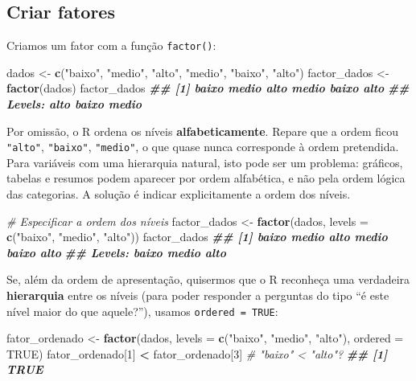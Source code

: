 \documentclass[
  portuguese,
  11pt,
  openany]{book}
\newenvironment{Shaded}{\begin{snugshade}}{\end{snugshade}}
\newcommand{\AttributeTok}[1]{\textcolor[rgb]{0.13,0.29,0.53}{#1}}
\newcommand{\CommentTok}[1]{\textcolor[rgb]{0.56,0.35,0.01}{\textit{#1}}}
\newcommand{\ConstantTok}[1]{\textcolor[rgb]{0.56,0.35,0.01}{#1}}
\newcommand{\DecValTok}[1]{\textcolor[rgb]{0.00,0.00,0.81}{#1}}
\newcommand{\DocumentationTok}[1]{\textcolor[rgb]{0.56,0.35,0.01}{\textbf{\textit{#1}}}}
\newcommand{\FunctionTok}[1]{\textcolor[rgb]{0.13,0.29,0.53}{\textbf{#1}}}
\newcommand{\NormalTok}[1]{#1}
\newcommand{\OtherTok}[1]{\textcolor[rgb]{0.56,0.35,0.01}{#1}}
\newcommand{\SpecialCharTok}[1]{\textcolor[rgb]{0.81,0.36,0.00}{\textbf{#1}}}
\newcommand{\StringTok}[1]{\textcolor[rgb]{0.31,0.60,0.02}{#1}}
\begin{document}
\subsection{Criar fatores}\label{criar-fatores}

Criamos um fator com a função \texttt{factor()}:

\begin{Shaded}
\begin{Highlighting}[]
\NormalTok{dados }\OtherTok{\textless{}{-}} \FunctionTok{c}\NormalTok{(}\StringTok{"baixo"}\NormalTok{, }\StringTok{"medio"}\NormalTok{, }\StringTok{"alto"}\NormalTok{, }\StringTok{"medio"}\NormalTok{, }\StringTok{"baixo"}\NormalTok{, }\StringTok{"alto"}\NormalTok{)}
\NormalTok{factor\_dados }\OtherTok{\textless{}{-}} \FunctionTok{factor}\NormalTok{(dados)}
\NormalTok{factor\_dados}
\DocumentationTok{\#\# [1] baixo medio alto  medio baixo alto }
\DocumentationTok{\#\# Levels: alto baixo medio}
\end{Highlighting}
\end{Shaded}

Por omissão, o R ordena os níveis \textbf{alfabeticamente}. Repare que a ordem ficou \texttt{"alto"}, \texttt{"baixo"}, \texttt{"medio"}, o que quase nunca corresponde à ordem pretendida. Para variáveis com uma hierarquia natural, isto pode ser um problema: gráficos, tabelas e resumos podem aparecer por ordem alfabética, e não pela ordem lógica das categorias. A solução é indicar explicitamente a ordem dos níveis.

\begin{Shaded}
\begin{Highlighting}[]
\CommentTok{\# Especificar a ordem dos níveis}
\NormalTok{factor\_dados }\OtherTok{\textless{}{-}} \FunctionTok{factor}\NormalTok{(dados, }\AttributeTok{levels =} \FunctionTok{c}\NormalTok{(}\StringTok{"baixo"}\NormalTok{, }\StringTok{"medio"}\NormalTok{, }\StringTok{"alto"}\NormalTok{))}
\NormalTok{factor\_dados}
\DocumentationTok{\#\# [1] baixo medio alto  medio baixo alto }
\DocumentationTok{\#\# Levels: baixo medio alto}
\end{Highlighting}
\end{Shaded}

Se, além da ordem de apresentação, quisermos que o R reconheça uma verdadeira
\textbf{hierarquia} entre os níveis (para poder responder a perguntas do tipo ``é este
nível maior do que aquele?''), usamos \texttt{ordered\ =\ TRUE}:

\begin{Shaded}
\begin{Highlighting}[]
\NormalTok{fator\_ordenado }\OtherTok{\textless{}{-}} \FunctionTok{factor}\NormalTok{(dados,}
                         \AttributeTok{levels =} \FunctionTok{c}\NormalTok{(}\StringTok{"baixo"}\NormalTok{, }\StringTok{"medio"}\NormalTok{, }\StringTok{"alto"}\NormalTok{),}
                         \AttributeTok{ordered =} \ConstantTok{TRUE}\NormalTok{)}
\NormalTok{fator\_ordenado[}\DecValTok{1}\NormalTok{] }\SpecialCharTok{\textless{}}\NormalTok{ fator\_ordenado[}\DecValTok{3}\NormalTok{]   }\CommentTok{\# "baixo" \textless{} "alto"?}
\DocumentationTok{\#\# [1] TRUE}
\end{Highlighting}
\end{Shaded}
\end{document}
